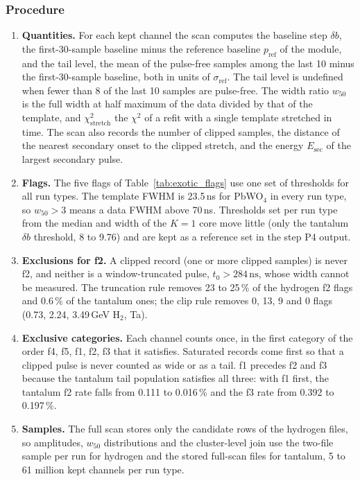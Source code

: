 \documentclass[11pt]{article}
\newcommand{\ns}{\,\mathrm{ns}}
\begin{document}
\subsubsection{Procedure}

\begin{enumerate}
\item \textbf{Quantities.} For each kept channel the scan computes the baseline step $\delta b$, the first-30-sample baseline minus the reference baseline $p_{\mathrm{ref}}$ of the module, and the tail level, the mean of the pulse-free samples among the last 10 minus the first-30-sample baseline, both in units of $\sigma_{\mathrm{ref}}$. The tail level is undefined when fewer than 8 of the last 10 samples are pulse-free. The width ratio $w_{50}$ is the full width at half maximum of the data divided by that of the template, and $\chi^2_{\mathrm{stretch}}$ the $\chi^2$ of a refit with a single template stretched in time. The scan also records the number of clipped samples, the distance of the nearest secondary onset to the clipped stretch, and the energy $E_{\mathrm{sec}}$ of the largest secondary pulse.
\item \textbf{Flags.} The five flags of Table~\ref{tab:exotic_flags} use one set of thresholds for all run types. The template FWHM is 23.5\,ns for PbWO$_4$ in every run type, so $w_{50} > 3$ means a data FWHM above 70\,ns. Thresholds set per run type from the median and width of the $K = 1$ core move little (only the tantalum $\delta b$ threshold, 8 to 9.76) and are kept as a reference set in the step P4 output.
\item \textbf{Exclusions for f2.} A clipped record (one or more clipped samples) is never f2, and neither is a window-truncated pulse, $t_0 > 284\ns$, whose width cannot be measured. The truncation rule removes 23 to 25\,\% of the hydrogen f2 flags and 0.6\,\% of the tantalum ones; the clip rule removes 0, 13, 9 and 0 flags (0.73, 2.24, 3.49\,GeV H$_2$, Ta).
\item \textbf{Exclusive categories.} Each channel counts once, in the first category of the order f4, f5, f1, f2, f3 that it satisfies. Saturated records come first so that a clipped pulse is never counted as wide or as a tail. f1 precedes f2 and f3 because the tantalum tail population satisfies all three: with f1 first, the tantalum f2 rate falls from 0.111 to 0.016\,\% and the f3 rate from 0.392 to 0.197\,\%.
\item \textbf{Samples.} The full scan stores only the candidate rows of the hydrogen files, so amplitudes, $w_{50}$ distributions and the cluster-level join use the two-file sample per run for hydrogen and the stored full-scan files for tantalum, 5 to 61 million kept channels per run type.
\end{enumerate}
\end{document}
